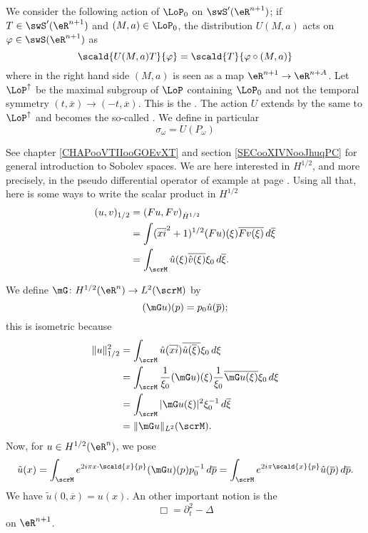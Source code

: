 We consider the following action of $\LoP_0$ on $\swS'(\eR^{n+1})$; if $T\in\swS'(\eR^{n+1})$ and $(M,a)\in\LoP_0$, the distribution $U(M,a)$ acts on $\varphi\in\swS(\eR^{n+1})$ as
\begin{equation}
	\scald{ U(M,a)T }{ \varphi }=\scald{ T }{ \varphi\circ(M,a) }
\end{equation}
where in the right hand side $(M,a)$ is seen as a map $\eR^{n+1}\to\eR^{n+A}$. Let $\LoP^{\uparrow}$ be the maximal subgroup of $\LoP$ containing $\LoP_0$ and not the temporal symmetry $(t,\overline{x})\to(-t,\overline{x})$. This is the . The action $U$ extends by the same to $\LoP^{\uparrow}$ and becomes the so-called . We define in particular
\begin{equation}
\sigma_{\omega}=U(P_{\omega})
\end{equation}

See chapter \ref{CHAPooVTIIooGOEvXT} and section \ref{SECooXIVNooJhuqPC} for general introduction to Sobolev spaces. We are here interested in $H^{1/2}$, and more precisely, in the pseudo differential operator of example at page \pageref{pg_exem_psdo}. Using all that, here is some ways to write the scalar product in $H^{1/2}$ 
\begin{equation}
\begin{split}
  (u,v)_{1/2}&=(Fu,Fv)_{\hat H^{1/2}}\\
		&=\int (\overline{xi}^2+1)^{1/2}(Fu)(\xi)\overline{ Fv(\xi) }\,d\overline{ \xi }\\
		&=\int_{\scrM}\hat u(\xi)\overline{ \hat v(\xi) }\xi_0\,d\overline{ \xi }.
\end{split}
\end{equation}

We define $\mG\colon H^{1/2}(\eR^n)\to L^2(\scrM)$ by
\begin{equation}
  (\mG u)(p)=p_0\hat u(\overline{p});
\end{equation}
this is isometric because
\[ 
\begin{split}
  \| u \|_{1/2}^2&=\int_{\scrM}\hat u(\overline{xi})\overline{ \hat u(\overline{ \xi }) }\xi_0\,d\xi\\
		&=\int_{\scrM}\frac{1}{ \xi_0 }(\mG u)(\xi)\frac{1}{ \xi_0 }\overline{ \mG u(\xi) }\xi_0\,d\xi\\
		&=\int_{\scrM}| \mG u(\xi) |^2\xi_0^{-1}\,d\overline{ \xi }\\
		&=\| \mG u \|_{L^2}(\scrM).
\end{split}  
\]
Now, for $u\in H^{1/2}(\eR^n)$, we pose
\begin{equation}
  \tilde u(x)=\int_{\scrM} e^{2i\pi x\cdot\scald{ x }{ p } }(\mG u)(p)p_0^{-1}\,d\overline{p}
		=\int_{\scrM} e^{2i\pi\scald{ x }{ p }}\hat u(\overline{p})\,d\overline{p}.
\end{equation}
We have $\tilde u(0,\overline{x})=u(x)$. An other important notion is the 
\[ 
  \Box=\partial_t^2-\Delta
\]
on $\eR^{n+1}$.


